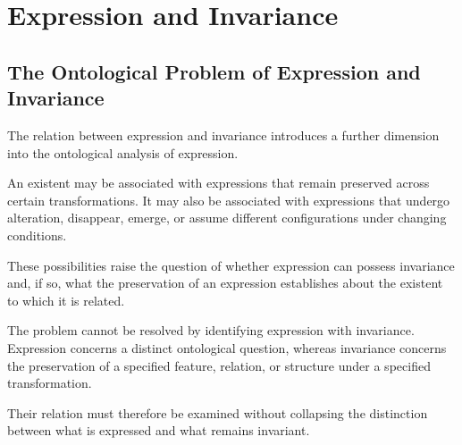%
%

\section{Expression and Invariance}
\label{sec:expression-and-invariance}

\subsection{The Ontological Problem of Expression and Invariance}

The relation between expression and invariance introduces
a further dimension into the ontological analysis of
expression.

An existent may be associated with expressions that
remain preserved across certain transformations.
It may also be associated with expressions that
undergo alteration, disappear, emerge, or assume
different configurations under changing conditions.

These possibilities raise the question of whether
expression can possess invariance and, if so,
what the preservation of an expression establishes
about the existent to which it is related.

The problem cannot be resolved by identifying
expression with invariance. Expression concerns
a distinct ontological question, whereas invariance
concerns the preservation of a specified feature,
relation, or structure under a specified transformation.

Their relation must therefore be examined without
collapsing the distinction between what is expressed
and what remains invariant.

